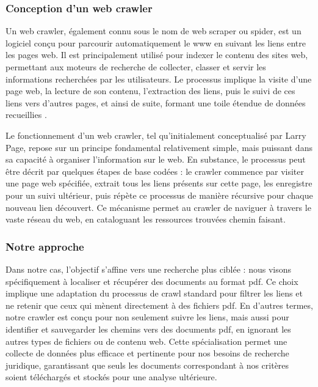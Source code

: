 \subsubsection{Conception d'un web crawler}

Un web crawler, également connu sous le nom de web scraper ou spider, est un logiciel conçu pour parcourir automatiquement le \ac{www} en suivant les liens entre les pages web. Il est principalement utilisé pour indexer le contenu des sites web, permettant aux moteurs de recherche de collecter, classer et servir les informations recherchées par les utilisateurs. Le processus implique la visite d'une page web, la lecture de son contenu, l'extraction des liens, puis le suivi de ces liens vers d'autres pages, et ainsi de suite, formant une toile étendue de données recueillies \cite{frwiki:205243717, Chakrabarti_2002, BRIN1998107}.

Le fonctionnement d'un web crawler, tel qu'initialement conceptualisé par Larry Page, repose sur un principe fondamental relativement simple, mais puissant dans sa capacité à organiser l'information sur le web. En substance, le processus peut être décrit par quelques étapes de base codées : le crawler commence par visiter une page web spécifiée, extrait tous les liens présents sur cette page, les enregistre pour un suivi ultérieur, puis répète ce processus de manière récursive pour chaque nouveau lien découvert. Ce mécanisme permet au crawler de naviguer à travers le vaste réseau du web, en cataloguant les ressources trouvées chemin faisant.

\subsubsection{Notre approche}

Dans notre cas, l'objectif s'affine vers une recherche plus ciblée : nous visons spécifiquement à localiser et récupérer des documents au format \ac{pdf}. Ce choix implique une adaptation du processus de crawl standard pour filtrer les liens et ne retenir que ceux qui mènent directement à des fichiers \ac{pdf}. En d'autres termes, notre crawler est conçu pour non seulement suivre les liens, mais aussi pour identifier et sauvegarder les chemins vers des documents \ac{pdf}, en ignorant les autres types de fichiers ou de contenu web. Cette spécialisation permet une collecte de données plus efficace et pertinente pour nos besoins de recherche juridique, garantissant que seuls les documents correspondant à nos critères soient téléchargés et stockés pour une analyse ultérieure.

